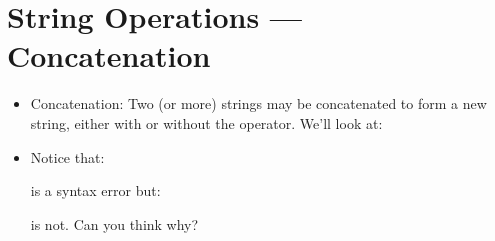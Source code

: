 \documentclass[letterpaper,10pt,english]{sphinxmanual}
\begin{document}
\section{String Operations — Concatenation}
\label{\detokenize{lecture_notes/lec03_strings:string-operations-concatenation}}\begin{itemize}
\item {} 
Concatenation: Two (or more) strings may be concatenated to form a
new string, either with or without the \sphinxcode{\sphinxupquote{+}} operator. We’ll look at:

\begin{sphinxVerbatim}[commandchars=\\\{\}]
  
  
  
    
  
  
\end{sphinxVerbatim}

\item {} 
Notice that:

\begin{sphinxVerbatim}[commandchars=\\\{\}]
  
  
 
\end{sphinxVerbatim}

is a syntax error but:

\begin{sphinxVerbatim}[commandchars=\\\{\}]
 
\end{sphinxVerbatim}

is not. Can you think why?

\end{itemize}
\end{document}
